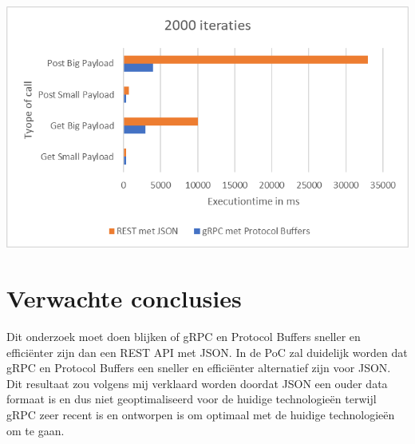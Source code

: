 	\centering
	\includegraphics[width=1\linewidth]{screenshot002}

	



\section{Verwachte conclusies}
\label{sec:verwachte_conclusies}

Dit onderzoek moet doen blijken of gRPC en Protocol Buffers sneller en efficiënter zijn dan een REST API met JSON. In de PoC zal duidelijk worden dat gRPC en Protocol Buffers een sneller en efficiënter alternatief zijn voor JSON. Dit resultaat zou volgens mij verklaard worden doordat JSON een ouder data formaat is en dus niet geoptimaliseerd voor de huidige technologieën terwijl gRPC zeer recent is en ontworpen is om optimaal met de huidige technologieën om te gaan.

